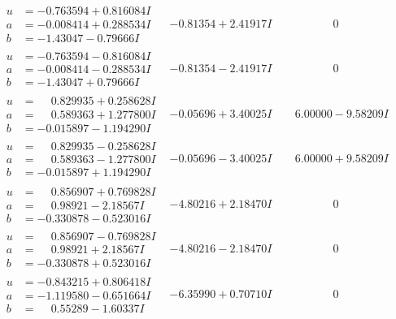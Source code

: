 \documentclass[1p]{elsarticle_modified}
\theoremstyle{definition}
\begin{document}
$$\begin{array}{c|c|c}
\begin{aligned}
u &= -0.763594 + 0.816084 I \\
a &= -0.008414 + 0.288534 I \\
b &= -1.43047 - 0.79666 I\end{aligned}
 & -0.81354 + 2.41917 I & \phantom{-0.000000 } 0 \\ \hline\begin{aligned}
u &= -0.763594 - 0.816084 I \\
a &= -0.008414 - 0.288534 I \\
b &= -1.43047 + 0.79666 I\end{aligned}
 & -0.81354 - 2.41917 I & \phantom{-0.000000 } 0 \\ \hline\begin{aligned}
u &= \phantom{-}0.829935 + 0.258628 I \\
a &= \phantom{-}0.589363 + 1.277800 I \\
b &= -0.015897 - 1.194290 I\end{aligned}
 & -0.05696 + 3.40025 I & \phantom{-}6.00000 - 9.58209 I \\ \hline\begin{aligned}
u &= \phantom{-}0.829935 - 0.258628 I \\
a &= \phantom{-}0.589363 - 1.277800 I \\
b &= -0.015897 + 1.194290 I\end{aligned}
 & -0.05696 - 3.40025 I & \phantom{-}6.00000 + 9.58209 I \\ \hline\begin{aligned}
u &= \phantom{-}0.856907 + 0.769828 I \\
a &= \phantom{-}0.98921 - 2.18567 I \\
b &= -0.330878 - 0.523016 I\end{aligned}
 & -4.80216 + 2.18470 I & \phantom{-0.000000 } 0 \\ \hline\begin{aligned}
u &= \phantom{-}0.856907 - 0.769828 I \\
a &= \phantom{-}0.98921 + 2.18567 I \\
b &= -0.330878 + 0.523016 I\end{aligned}
 & -4.80216 - 2.18470 I & \phantom{-0.000000 } 0 \\ \hline\begin{aligned}
u &= -0.843215 + 0.806418 I \\
a &= -1.119580 - 0.651664 I \\
b &= \phantom{-}0.55289 - 1.60337 I\end{aligned}
 & -6.35990 + 0.70710 I & \phantom{-0.000000 } 0 \\ \hline\begin{aligned}

\end{aligned}
\end{array}$$
\end{document}
